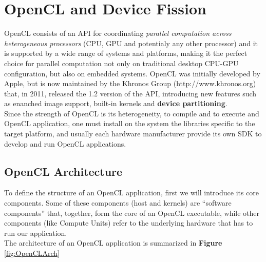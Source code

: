 \section{OpenCL and Device Fission} \label{sect:openCL}

OpenCL consists of an API for coordinating \textit{parallel computation across heterogeneous processors} (CPU, GPU and potentialy any other processor) and it is supported by a wide range of systems and platforms, making it the perfect choice for parallel computation not only on traditional desktop CPU-GPU configuration, but also on embedded systems.
OpenCL was initially developed by Apple, but is now maintained by the Khronos Group (http://www.khronos.org) that, in 2011, released the 1.2 version of the API, introducing new features such as enanched image support, built-in kernels and \textbf{device partitioning}.\\
Since the strength of OpenCL is its heterogeneity, to compile and to execute and OpenCL application, one must install on the system the libraries specific to the target platform, and usually each hardware manufacturer provide its own SDK to develop and run OpenCL applications.

\subsection{OpenCL Architecture} \label{sect:openCLArch}

%
%
%
To define the structure of an OpenCL application, first we will introduce its core components. Some of these components (host and kernels) are ``software components'' that, together, form the core of an OpenCL executable, while other components (like Compute Units) refer to the underlying hardware that has to run our application.\\
The architecture of an OpenCL application is summarized in \textbf{Figure} \ref{fig:OpenCLArch}

